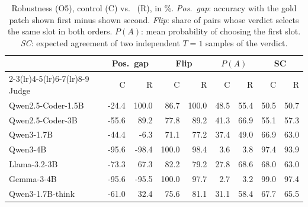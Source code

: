 \begin{table}[t]
\caption{Robustness (O5), control (C) vs.\ \RJB{} (R), in \%. \emph{Pos.\ gap}: accuracy with the gold patch shown first minus shown second. \emph{Flip}: share of pairs whose verdict selects the same slot in both orders. $P(A)$: mean probability of choosing the first slot. \emph{SC}: expected agreement of two independent $T{=}1$ samples of the verdict.}
\label{tab:robust}
\centering\footnotesize
\begin{tabular}{@{}lrrrrrrrr@{}}
\toprule
 & \multicolumn{2}{c}{Pos.\ gap} & \multicolumn{2}{c}{Flip} & \multicolumn{2}{c}{$P(A)$} & \multicolumn{2}{c}{SC} \\
\cmidrule(lr){2-3}\cmidrule(lr){4-5}\cmidrule(lr){6-7}\cmidrule(lr){8-9}
Judge & C & R & C & R & C & R & C & R \\
\midrule
Qwen2.5-Coder-1.5B & -24.4 & 100.0 & 86.7 & 100.0 & 48.5 & 55.4 & 50.5 & 50.7 \\
Qwen2.5-Coder-3B & -55.6 & 89.2 & 77.8 & 89.2 & 41.3 & 66.9 & 55.1 & 57.3 \\
Qwen3-1.7B & -44.4 & -6.3 & 71.1 & 77.2 & 37.4 & 49.0 & 66.9 & 63.0 \\
Qwen3-4B & -95.6 & -98.4 & 100.0 & 98.4 & 3.6 & 3.8 & 97.4 & 93.9 \\
Llama-3.2-3B & -73.3 & 67.3 & 82.2 & 79.2 & 27.8 & 68.6 & 68.0 & 63.0 \\
Gemma-3-4B & -95.6 & -95.5 & 100.0 & 97.7 & 2.7 & 3.2 & 99.0 & 97.4 \\
Qwen3-1.7B-think & -61.0 & 32.4 & 75.6 & 81.1 & 31.1 & 58.4 & 67.7 & 65.5 \\
\bottomrule
\end{tabular}
\end{table}
